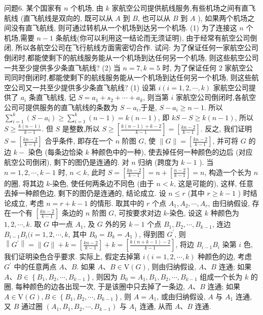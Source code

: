问题6. 某个国家有 $n$ 个机场, 由 $k$ 家航空公司提供航线服务,有些机场之间有直飞航线 (直飞航线是双向的, 既可以从 $A$ 到 $B$, 也可以从 $B$ 到 $A$ ), 如果两个机场之间没有直飞航线, 则可通过转机从一个机场到达另一个机场.
(1) 为了连接这 $n$ 个机场,需要 $n-1$ 条航线(你可以利用这一结论而无须证明), 由于经常有航空公司倒闭, 所以各航空公司在飞行航线方面需密切合作.
试问: 为了保证任何一家航空公司倒闭时,都能使剩下的航线服务能从一个机场到达任何另一个机场, 则这些航空公司一共至少提供多少条直飞航线?
(2) 当 $n=7, k=5$ 时, 为了保证任何 2 家航空公司同时倒闭时,都能使剩下的航线服务能从一个机场到达任何另一个机场, 则这些航空公司又一共至少提供多少条直飞航线?
(1) 设第 $i(i=1,2, \cdots, k)$ 家航空公司提供了 $a_i$ 条直飞航线, 记 $S= a_1+s_2+\cdots+a_k$, 则当第 $i$ 家航空公司倒闭时,各航空公司可提供服务的直飞航线的条数为 $S-a_i$,于是, $S-a_i \geqslant n-1$.
所以 $\sum_{i=1}^k\left(S-a_i\right) \geqslant \sum_{i=1}^k(n-1)=k(n-1)$, 即 $k S-S \geqslant k(n-1)$, 所以 $S \geqslant \frac{k(n-1)}{k-1}$.
但 $S$ 是整数,所以 $S \geqslant\left[\frac{k(n-1)+k-2}{k-1}\right]=\left[\frac{k n-2}{k-1}\right]$.
反之, 我们证明 $S=\left[\frac{k n-2}{k-1}\right]$ 合乎条件, 即存在一个 $n$ 阶图 $G$, 使 $\|G\|= \left[\frac{k n-2}{k-1}\right]$, 并可将 $G$ 的边 $k-$ 染色 (每条边恰染 $k$ 种颜色中的一种), 使去掉任何一种颜色的边后 (对应航空公司倒闭), 剩下的图仍是连通的.
对 $n$ 归纳 (跨度为 $k-1$ ).
当 $n=1,2, \cdots, k-1$ 时, $n<k$, 此时 $S=\left[\frac{k n-2}{k-1}\right]=n+\left[\frac{n-2}{k-1}\right]=n$, 构造一个长为 $n$ 的圈, 将其边 $k$-染色, 使任何两条边不同色 (由于 $n<k$, 这是可能的), 这样, 任意去掉一种颜色边, 剩下的图仍是连通的, 结论成立.
设 $n \leqslant r$ (其中 $r \geqslant k-1$ ) 时结论成立, 考虑 $n=r+k-1$ 的情形.
取其中的 $r$ 个点 $A_1, A_2, \cdots, A_r$, 由归纳假设, 存在一个有 $\left[\frac{k n-2}{k-1}\right]$ 条边的 $n$ 阶图 $G$, 可按要求对边 $k$-染色, 设这 $k$ 种颜色为 $1,2, \cdots, k$.
取 $G$ 中一点 $A_1$, 及 $G$ 外的另 $k-1$ 个点 $B_1, B_2, \cdots, B_{k-1}$, 连边 $B_{i-1} B_i(i= 1,2, \cdots, k$, 其中 $\left.B_0=B_k=A_1\right)$, 得到图 $G^{\prime}$, 则 $\left\|G^{\prime}\right\|=\|G\|+k= \left[\frac{k n-2}{k-1}\right]+k=\left[\frac{k(n+k-1)-2}{k-1}\right]$, 将边 $B_{i-1} B_i$ 染第 $i$ 色,我们证明染色合乎要求.
实际上, 假定去掉第 $i(i=1,2, \cdots, k)$ 种颜色的边, 考虑 $G^{\prime}$ 中的任意两点 $A 、 B$.
如果 $A 、 B \in \mathrm{V}(G)$, 则由归纳假设, $A 、 B$ 连通;
如果 $A 、 B \in\left\{B_1, B_2, \cdots, B_{k-1}\right\}$, 则因为 $B_0=A_1, B_1, B_2, \cdots, B_{k-1}$ 组成一个长为 $k$ 的圈, 每种颜色的边各出现一次, 于是该圈中只去掉了一条边, $A 、 B$ 连通;
如果 $A \in \mathrm{V}(G), B \in\left\{B_1, B_2, \cdots, B_{k-1}\right\}$, 则 $A=A_1$, 或由归纳假设, $A$ 与 $A_1$ 连通, 又 $B$ 通过圈 $\left(A_1, B_1, B_2, \cdots, B_{k-1}\right)$ 与 $A_1$ 连通, 从而 $A 、 B$ 连通.
